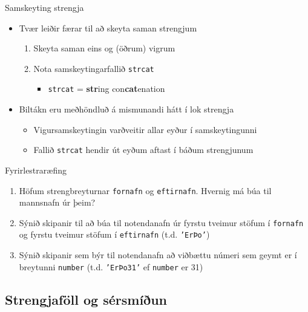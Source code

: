 \documentclass{beamer}
\begin{document}
\begin{frame}{Samskeyting strengja}
\begin{itemize}
 \item Tvær leiðir færar til að skeyta saman strengjum
 \begin{enumerate}
  \item Skeyta saman eins og (öðrum) vigrum
  \item Nota samskeytingarfallið \texttt{strcat}
  \begin{itemize}
   \item \texttt{strcat} = \textbf{str}ing con\textbf{cat}enation
  \end{itemize}  
 \end{enumerate}
 \item Biltákn eru meðhöndluð á mismunandi hátt í lok strengja
 \begin{itemize}
  \item Vigursamskeytingin varðveitir allar eyður í samskeytingunni
  \item Fallið \texttt{strcat} hendir út eyðum aftast í báðum strengjunum
 \end{itemize}
\end{itemize}
\end{frame}

\begin{frame}{Fyrirlestraræfing}
\begin{enumerate}
 \item Höfum strengbreyturnar \texttt{fornafn} og \texttt{eftirnafn}. Hvernig má búa til mannsnafn úr þeim?
 \item Sýnið skipanir til að búa til notendanafn úr fyrstu tveimur stöfum í \texttt{fornafn} og fyrstu tveimur stöfum í \texttt{eftirnafn} (t.d. \texttt{'ErÞo'})
 \item Sýnið skipanir sem býr til notendanafn að viðbættu númeri sem geymt er í breytunni \texttt{number} (t.d. \texttt{'ErÞo31'} ef \texttt{number} er 31)
\end{enumerate}

\end{frame}

\subsection{Strengjaföll og sérsmíðun}
\end{document}
